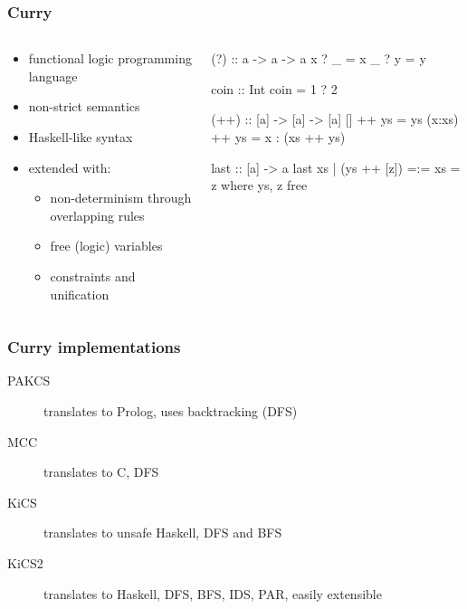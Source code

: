 \documentclass[
,hyperref={pdfpagelabels=false}
]{beamer}
\begin{document}
\begin{frame}[fragile]%
\frametitle{Curry}
\begin{columns}[t]

\begin{column}{.4\textwidth}
\begin{itemize}
\item functional logic programming language
\item non-strict semantics
\item Haskell-like syntax
\item extended with:
  \begin{itemize}
  \item non-determinism through overlapping rules
  \item free (logic) variables
  \item constraints and unification
  \end{itemize}
\end{itemize}
\end{column}

\begin{column}{.5\textwidth}
\begin{curry}%
(?) :: a -> a -> a
x ? _ = x
_ ? y = y

coin :: Int
coin = 1 ? 2

(++) :: [a] -> [a] -> [a]
[] ++ ys = ys
(x:xs) ++ ys = x : (xs ++ ys)

last :: [a] -> a
last xs | (ys ++ [z]) =:= xs = z
  where ys, z free
\end{curry}
\end{column}

\end{columns}
\end{frame}

\begin{frame}[fragile]%
\frametitle{Curry implementations} %
\begin{description}
\item[PAKCS] translates to Prolog, uses backtracking (DFS)
\item[MCC]   translates to C, DFS
\item[KiCS]  translates to unsafe Haskell, DFS and BFS
\item[KiCS2] translates to Haskell, DFS, BFS, IDS, PAR, easily extensible
\end{description}
\end{frame}
\end{document}
